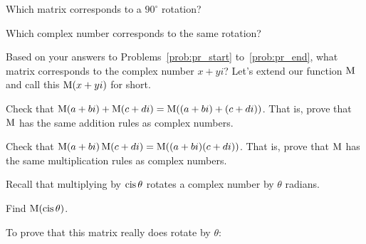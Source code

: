 \documentclass[../gatm_answers.tex]{subfiles}
\begin{document}
\begin{outer_problem}
\item \label{prob:pr_end}
\end{outer_problem}

\begin{inner_problem}[start=1]
\item Which matrix corresponds to a $90^\circ$ rotation?
\end{inner_problem}

\begin{inner_problem}
\item Which complex number corresponds to the same rotation?
\end{inner_problem}

\begin{outer_problem}
\item Based on your answers to Problems~\ref{prob:pr_start} to~\ref{prob:pr_end}, what matrix corresponds to the complex number $x+yi$? Let's extend our function $\operatorname{M}$ and call this $\operatorname{M} (x+yi)$ for short.
\end{outer_problem}

\begin{outer_problem}
\item Check that $\operatorname{M} (a+bi)+\operatorname{M} (c+di)=\operatorname{M}((a+bi)+(c+di))$. That is, prove that $\operatorname{M}$ has the same addition rules as complex numbers.
\end{outer_problem}

\begin{outer_problem}
\item Check that $\operatorname{M} (a+bi)\operatorname{M} (c+di)=\operatorname{M}((a+bi)(c+di))$. That is, prove that $\operatorname{M}$ has the same multiplication rules as complex numbers.
\end{outer_problem}

\begin{outer_problem}
\item Recall that multiplying by $\operatorname{cis}\theta$ rotates a complex number by $\theta$ radians.
\end{outer_problem} 

\begin{inner_problem}[start=1]
\item Find $\operatorname{M} (\operatorname{cis}\theta)$.
\end{inner_problem}

\begin{inner_problem}
\item To prove that this matrix really does rotate by $\theta$:
\end{inner_problem}
\end{document}
